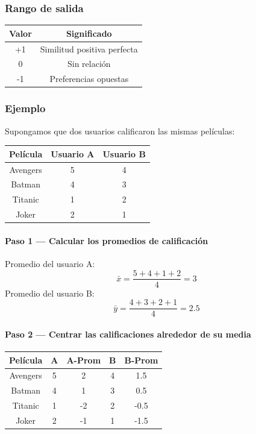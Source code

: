 \documentclass[12pt]{article}
\begin{document}
\subsubsection*{Rango de salida}
\begin{center}
\begin{tabular}{|c|c|}
\hline
Valor & Significado \\
\hline
+1 & Similitud positiva perfecta \\
0 & Sin relación \\
-1 & Preferencias opuestas \\
\hline
\end{tabular}
\end{center}

\subsubsection*{Ejemplo}
Supongamos que dos usuarios calificaron las mismas películas:
\begin{center}
\begin{tabular}{|c|c|c|}
\hline
Película & Usuario A & Usuario B \\
\hline
Avengers & 5 & 4 \\
Batman & 4 & 3 \\
Titanic & 1 & 2 \\
Joker & 2 & 1 \\
\hline
\end{tabular}
\end{center}

\paragraph{Paso 1 --- Calcular los promedios de calificación}
Promedio del usuario A:
\[
\bar{x}=\frac{5+4+1+2}{4}=3
\]
Promedio del usuario B:
\[
\bar{y}=\frac{4+3+2+1}{4}=2.5
\]

\paragraph{Paso 2 --- Centrar las calificaciones alrededor de su media}
\begin{center}
\begin{tabular}{|c|c|c|c|c|}
\hline
Película & A & A-Prom & B & B-Prom \\
\hline
Avengers & 5 & 2 & 4 & 1.5 \\
Batman & 4 & 1 & 3 & 0.5 \\
Titanic & 1 & -2 & 2 & -0.5 \\
Joker & 2 & -1 & 1 & -1.5 \\
\hline
\end{tabular}
\end{center}
\end{document}
